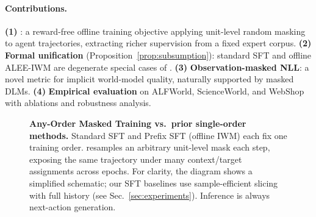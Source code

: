 \paragraph{Contributions.}
\textbf{(1)} \textbf{\aomt{}}: a reward-free offline training objective applying
unit-level random masking to agent trajectories, extracting richer supervision from
a fixed expert corpus.
\textbf{(2)} \textbf{Formal unification} (Proposition~\ref{prop:subsumption}):
standard SFT and offline ALEE-IWM are degenerate special cases of \aomt{}.
\textbf{(3)} \textbf{Observation-masked NLL}: a novel metric for implicit
world-model quality, naturally supported by masked DLMs.
\textbf{(4)} \textbf{Empirical evaluation} on ALFWorld, ScienceWorld, and WebShop
with ablations and robustness analysis.

\begin{figure}[t]
  \centering
  
  \caption{%
    \textbf{Any-Order Masked Training vs.\ prior single-order methods.}
    Standard SFT and Prefix SFT (offline IWM) each fix one training order.
    \aomt{} resamples an arbitrary unit-level mask each step, exposing the same
    trajectory under many context/target assignments across epochs.
    For clarity, the diagram shows a simplified schematic; our SFT baselines
    use sample-efficient slicing with full history (see Sec.~\ref{sec:experiments}).
    Inference is always next-action generation.
  }
  \label{fig:method_overview}
\end{figure}
